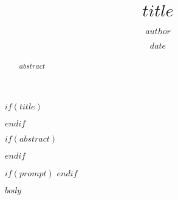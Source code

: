 \documentclass[12pt,paper=letter]{article}
\title{$title$}
\author{$author$}
\date{$date$}
\begin{document}
    $if(title)$
    \maketitle
    $endif$

    $if(abstract)$
    \begin{abstract}
        $abstract$
    \end{abstract}
    $endif$

    $if(prompt)$
    $endif$

    $body$
\end{document}
